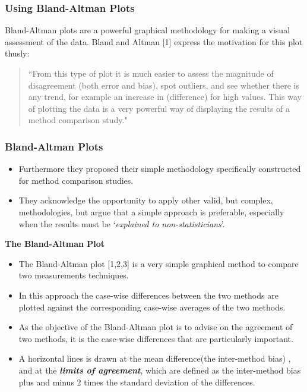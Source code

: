 \documentclass[compress]{beamer}        %
\makeatletter
\newcommand{\tcb}{\textcolor{beamer@blendedblue}}
\makeatother
\begin{document}
\begin{frame}
\frametitle{Using Bland-Altman Plots}
Bland-Altman plots are a powerful graphical methodology for making
a visual assessment of the data. Bland and Altman [1] express the
motivation for this plot thusly:
\begin{quote}
``From this type of plot it is much easier to assess the magnitude
of disagreement (both error and bias), spot outliers, and see
whether there is any trend, for example an increase in
(difference) for high values. This way of plotting the data is a
very powerful way of displaying the results of a method comparison
study."
\end{quote}
\end{frame}

\begin{frame}
\frametitle{Bland-Altman Plots}
\large
\begin{itemize}
\item 
Furthermore they proposed their simple methodology specifically
constructed for method comparison studies. 
\item They acknowledge the
opportunity to apply other valid, but complex, methodologies, but
argue that a simple approach is preferable, especially when the
results must be `\textit{explained to non-statisticians}'.
\end{itemize}
\end{frame}

\begin{frame}{\bf \tcb{The Bland-Altman Plot}}
\begin{itemize}\itemsep0.4cm

\item The Bland-Altman plot [1,2,3] is a very simple graphical method to compare two measurements techniques. \item In this approach the case-wise differences between the two methods are plotted against the corresponding case-wise averages of the two methods.
\item As the
objective of the Bland-Altman plot is to advise on the agreement
of two methods, it is the case-wise differences that are
particularly important. 
\item A horizontal lines is drawn at the mean difference(the inter-method bias) , and at the \textbf{\textit{limits of agreement}}, which are defined as the inter-method bias plus and minus 2 times the standard deviation of the differences.
\end{itemize}
\end{frame}
\end{document}

